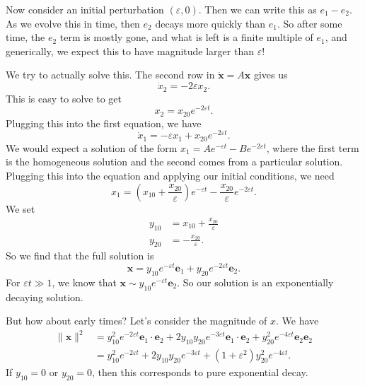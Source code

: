 \documentclass[a4paper]{article}
\begin{document}
Now consider an initial perturbation $(\varepsilon, 0)$. Then we can write this as $e_1 - e_2$. As we evolve this in time, then $e_2$ decays more quickly than $e_1$. So after some time, the $e_2$ term is mostly gone, and what is left is a finite multiple of $e_1$, and generically, we expect this to have magnitude larger than $\varepsilon$!

We try to actually solve this. The second row in $\dot{\mathbf{x}} = A\mathbf{x}$ gives us
\[
  \dot{x}_2 = -2\varepsilon x_2.
\]
This is easy to solve to get
\[
  x_2 = x_{20} e^{-2\varepsilon t}.
\]
Plugging this into the first equation, we have
\[
  \dot{x}_1 = -\varepsilon x_1 + x_{20} e^{-2\varepsilon t}.
\]
We would expect a solution of the form $x_1 = A e^{-\varepsilon t} - B e^{-2 \varepsilon t}$, where the first term is the homogeneous solution and the second comes from a particular solution. Plugging this into the equation and applying our initial conditions, we need
\[
  x_1 = \left(x_{10} + \frac{x_{20}}{\varepsilon}\right) e^{-\varepsilon t} - \frac{x_{20}}{\varepsilon} e^{-2 \varepsilon t}.
\]
We set
\begin{align*}
  y_{10} &= x_{10} + \frac{x_{20}}{\varepsilon}\\
  y_{20} &= -\frac{x_{20}}{\varepsilon}.
\end{align*}
So we find that the full solution is
\[
  \mathbf{x} = y_{10} e^{-\varepsilon t} \mathbf{e}_1 + y_{20} e^{-2\varepsilon t} \mathbf{e}_2.
\]
For $\varepsilon t \gg 1$, we know that $\mathbf{x} \sim y_{10} e^{-\varepsilon t} \mathbf{e}_2$. So our solution is an exponentially decaying solution.

But how about early times? Let's consider the magnitude of $x$. We have
\begin{align*}
  \|\mathbf{x}\|^2 &= y_{10}^2 e^{-2 \varepsilon t} \mathbf{e}_1 \cdot \mathbf{e}_2 + 2y_{10} y_{20} e^{-3\varepsilon t} \mathbf{e}_1 \cdot \mathbf{e}_2 + y_{20}^2 e^{-4\varepsilon t} \mathbf{e}_2 \mathbf{e}_2\\
  &= y_{10}^2 e^{-2\varepsilon t} + 2y_{10} y_{20} e^{-3 \varepsilon t} + (1 + \varepsilon^2) y_{20}^2 e^{-4 \varepsilon t}.
\end{align*}
If $y_{10} = 0$ or $y_{20} = 0$, then this corresponds to pure exponential decay.
\end{document}
